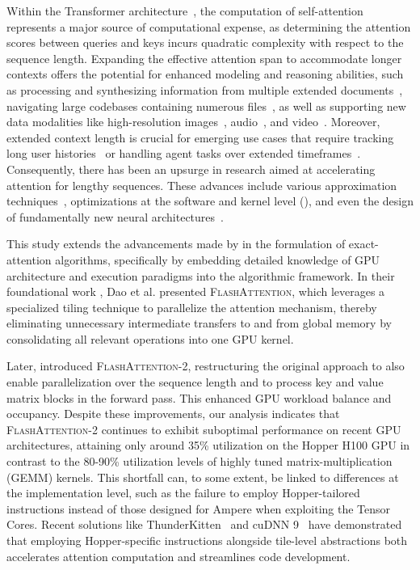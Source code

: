 Within the Transformer architecture~\citep{vaswani2017attention}, the computation of self-attention represents a major source of computational expense, as determining the attention scores between queries and keys incurs quadratic complexity with respect to the sequence length. Expanding the effective attention span to accommodate longer contexts offers the potential for enhanced modeling and reasoning abilities, such as processing and synthesizing information from multiple extended documents~\citep{guo2021longt5,shaham2022scrolls,peng2023yarn}, navigating large codebases containing numerous files~\citep{roziere2023code, li2023starcoder}, as well as supporting new data modalities like high-resolution images~\citep{chen2022scaling}, audio~\citep{gulati2020conformer}, and video~\citep{ho2022video}. Moreover, extended context length is crucial for emerging use cases that require tracking long user histories~\citep{sun2019bert4rec} or handling agent tasks over extended timeframes~\citep{yao2022react}. Consequently, there has been an upsurge in research aimed at accelerating attention for lengthy sequences. These advances include various approximation techniques~\citep{katharopoulos2020transformers,choromanski2020rethinking,
tay2020efficient}, optimizations at the software and kernel level (\citep{rabe2021self,dao2022flashattention,kwon2023efficient}), and even the design of fundamentally new neural architectures~\citep{peng2023rwkv,sun2023retentive,gu2023mamba}.

This study extends the advancements made by \citet{dao2022flashattention} in the formulation of exact-attention algorithms, specifically by embedding detailed knowledge of GPU architecture and execution paradigms into the algorithmic framework. In their foundational work \citep{dao2022flashattention}, Dao et al. presented \textsc{FlashAttention}, which leverages a specialized tiling technique to parallelize the attention mechanism, thereby eliminating unnecessary intermediate transfers to and from global memory by consolidating all relevant operations into one GPU kernel. 

Later, \citet{dao2023flashattention2} introduced \textsc{FlashAttention-2}, restructuring the original approach to also enable parallelization over the sequence length and to process key and value matrix blocks in the forward pass. This enhanced GPU workload balance and occupancy. Despite these improvements, our analysis indicates that \textsc{FlashAttention-2} continues to exhibit suboptimal performance on recent GPU architectures, attaining only around 35\% utilization on the Hopper H100 GPU in contrast to the 80-90\% utilization levels of highly tuned matrix-multiplication (GEMM) kernels. This shortfall can, to some extent, be linked to differences at the implementation level, such as the failure to employ Hopper-tailored instructions instead of those designed for Ampere when exploiting the Tensor Cores. Recent solutions like ThunderKitten~\citep{spector2024thunder} and cuDNN 9~\citep{cudnn9} have demonstrated that employing Hopper-specific instructions alongside tile-level abstractions both accelerates attention computation and streamlines code development.

